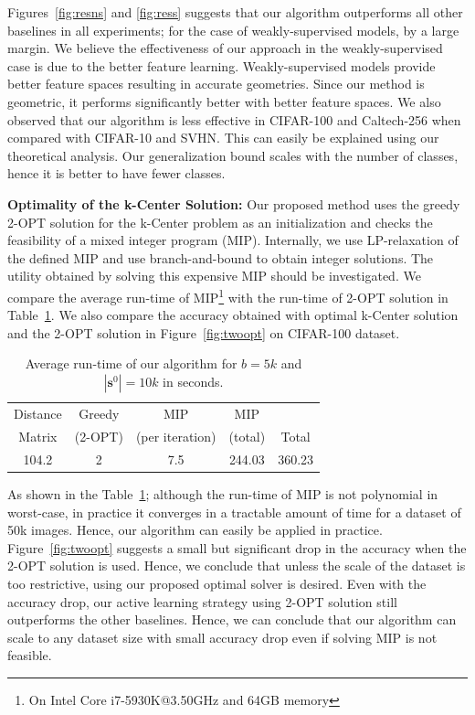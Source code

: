 \documentclass{article} %
\begin{document}
Figures~\ref{fig:resns} and \ref{fig:ress} suggests that our algorithm outperforms all other baselines in all experiments; for the case of weakly-supervised models, by a large margin. We believe the effectiveness of our approach in the weakly-supervised case is due to the better feature learning. Weakly-supervised models provide better feature spaces resulting in accurate geometries. Since our method is geometric, it performs significantly better with better feature spaces. We also observed that our algorithm is less effective in CIFAR-100 and Caltech-256 when compared with CIFAR-10 and SVHN. This can easily be explained using our theoretical analysis. Our generalization bound scales with the number of classes, hence it is better to have fewer classes.

\noindent\textbf{Optimality of the k-Center Solution:} Our proposed method uses the greedy 2-OPT solution for the k-Center problem as an initialization and checks the feasibility of a mixed integer program (MIP). Internally, we use LP-relaxation of the defined MIP and use branch-and-bound to obtain integer solutions. The utility obtained by solving this expensive MIP should be investigated. We compare the average run-time of MIP\footnote{On Intel Core i7-5930K@3.50GHz and 64GB memory} with the run-time of 2-OPT solution in Table~\ref{tab:runtime}. We also compare the accuracy obtained with optimal k-Center solution and the 2-OPT solution in Figure~\ref{fig:twoopt} on CIFAR-100 dataset.


\begin{table}[ht]
\centering
\vspace{-3mm}
\caption{Average run-time of our algorithm for $b=5k$ and $|\mathbf{s}^0|=10k$ in seconds.}
\begin{tabular}{ccccc} \toprule
 Distance& Greedy & MIP & MIP &  \\
Matrix &(2-OPT) & (per iteration) & (total) & Total \\ \midrule
104.2  & 2   & 7.5  &  244.03  & 360.23  \\ \bottomrule
\end{tabular}
\label{tab:runtime}
\vspace{-2mm}
\end{table}

As shown in the Table~\ref{tab:runtime}; although the run-time of MIP is not polynomial in worst-case, in practice it converges in a tractable amount of time for a dataset of 50k images. Hence, our algorithm can easily be applied in practice. Figure~\ref{fig:twoopt} suggests a small but significant drop in the accuracy when the 2-OPT solution is used. Hence, we conclude that unless the scale of the dataset is too restrictive, using our proposed optimal solver is desired. Even with the accuracy drop, our active learning strategy using 2-OPT solution still outperforms the other baselines. Hence, we can conclude that our algorithm can scale to any dataset size with small accuracy drop even if solving MIP is not feasible.
\end{document}
